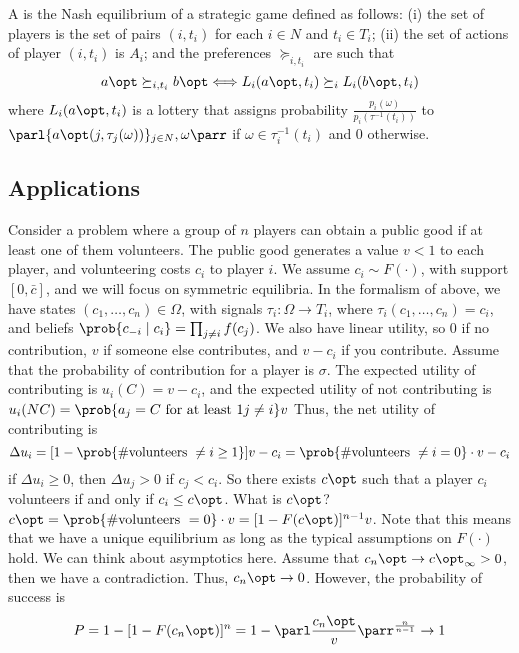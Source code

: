 \documentclass[10pt]{article}
\begin{document}
\begin{definition}
	A  is the Nash equilibrium of a strategic game defined as follows: (i) the set of players is the set of pairs $(i,t_i)$ for each $i \in N$ and $t_i \in T_i$; (ii) the set of actions of player $(i,t_i)$ is $A_i$; and the preferences $\succeq_{i,t_i}$ are such that \[a\opt \succeq_{i,t_i} b\opt \Longleftrightarrow L_i(a\opt,t_i) \succeq_i L_i(b\opt,t_i)\]where $L_i(a\opt,t_i)$ is a lottery that assigns probability $\frac{p_i(\omega)}{p_i(\tau^{-1}(t_i))}$ to $\parl \{a\opt(j,\tau_j(\omega))\}_{j\in N},\omega\parr$ if $\omega \in \tau_i^{-1}(t_i)$ and 0 otherwise.
\end{definition}

\subsection{Applications}

\begin{example}
	 Consider a problem where a group of $n$ players can obtain a public good if at least one of them volunteers. The public good generates a value $v < 1$ to each player, and volunteering costs $c_i$ to player $i$. We assume $c_i \sim F(\cdot)$, with support $[0,\bar{c}]$, and we will focus on symmetric equilibria. In the formalism of above, we have states $(c_1,\dots,c_n) \in \Omega$, with signals $\tau_i : \Omega \to T_i$, where $\tau_i(c_1,\dots,c_n) = c_i$, and beliefs $\prob\{c_{-i} \mid c_i\} = \prod_{j \ne i} f(c_j)$. We also have linear utility, so $0$ if no contribution, $v$ if someone else contributes, and $v-c_i$ if you contribute. Assume that the probability of contribution for a player is $\sigma$. The expected utility of contributing is $u_i(C) = v - c_i$, and the expected utility of not contributing is $u_i(NC) = \prob\{a_j = C \text{ for at least } 1 j \ne i\} v$ Thus, the net utility of contributing is \[\Delta u_i = [1-\prob\{\# \text{volunteers } \ne i \ge 1\}] v - c_i = \prob\{\# \text{volunteers } \ne i = 0\}\cdot v - c_i\]if $\Delta u_i \ge 0$, then $\Delta u_j > 0$ if $c_j < c_i$. So there exists $c\opt$ such that a player $c_i$ volunteers if and only if $c_i \le c\opt$. What is $c\opt$? $c\opt = \prob\{\# \text{volunteers } = 0\}\cdot v = [1-F(c\opt)]^{n-1}v$. Note that this means that we have a unique equilibrium as long as the typical assumptions on $F(\cdot)$ hold. We can think about asymptotics here. Assume that $c_n\opt \to c\opt_\infty > 0$, then we have a contradiction. Thus, $c_n\opt \to 0$. However, the probability of success is \[P = 1-[1-F(c_n\opt)]^n = 1-\parl \frac{c_n\opt}{v}\parr^{\frac{n}{n-1}} \to 1\]
\end{example}
\end{document}
